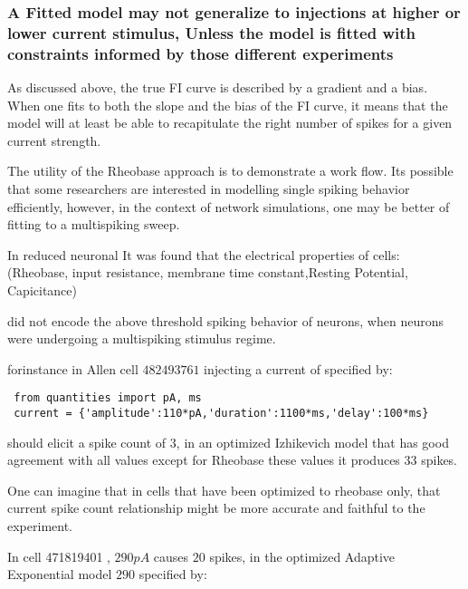 \subsubsection{A Fitted model may not generalize to injections at higher or lower current stimulus, Unless the model is fitted with constraints informed by those different experiments}
As discussed above, the true FI curve is described by a gradient and a bias. When one fits to both the slope and the bias of the FI curve, it means that the model will at least be able to recapitulate the right number of spikes for  a given current strength. %

%

The utility of the Rheobase approach is to demonstrate a work flow. Its possible that some researchers are interested in modelling single spiking behavior efficiently, however, in the context of network simulations, one may be better of fitting to a multispiking sweep.

In reduced neuronal It was found that the electrical properties of cells:
 (Rheobase, input resistance, membrane time constant,Resting Potential, Capicitance)

 did not encode the above threshold spiking behavior of neurons, when neurons were undergoing a multispiking stimulus regime.

 forinstance in Allen cell $482493761$ injecting a current of 
 specified by:
 \begin{verbatim}
 from quantities import pA, ms
 current = {'amplitude':110*pA,'duration':1100*ms,'delay':100*ms}
 \end{verbatim}
 should elicit a spike count of $3$, in an optimized Izhikevich model that has good agreement with all values except for Rheobase these values it produces $33$ spikes.

One can imagine that in cells that have been optimized to rheobase only, that current spike count relationship might be more  accurate and faithful to the experiment.

In cell 471819401 , $290 pA$ causes $20$ spikes,
in the optimized Adaptive Exponential model $290$
specified by:

